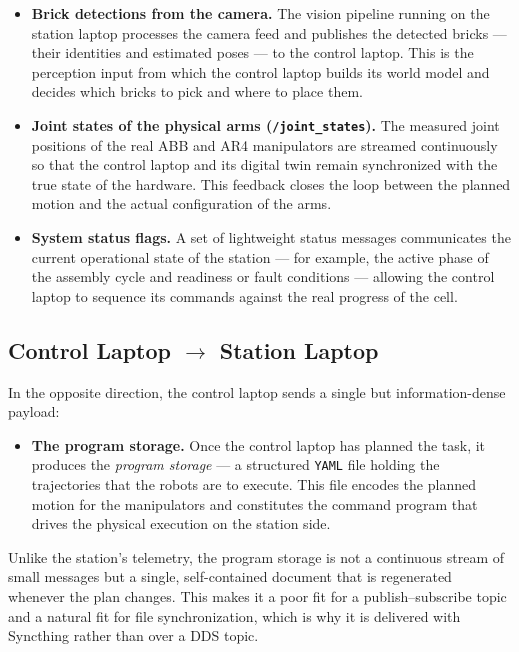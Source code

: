\begin{itemize}
    \item \textbf{Brick detections from the camera.} The vision pipeline running on the station laptop processes the camera feed and publishes the detected bricks --- their identities and estimated poses --- to the control laptop. This is the perception input from which the control laptop builds its world model and decides which bricks to pick and where to place them.
    \item \textbf{Joint states of the physical arms (\texttt{/joint\_states}).} The measured joint positions of the real ABB and AR4 manipulators are streamed continuously so that the control laptop and its digital twin remain synchronized with the true state of the hardware. This feedback closes the loop between the planned motion and the actual configuration of the arms.
    \item \textbf{System status flags.} A set of lightweight status messages communicates the current operational state of the station --- for example, the active phase of the assembly cycle and readiness or fault conditions --- allowing the control laptop to sequence its commands against the real progress of the cell.
\end{itemize}

\subsection{Control Laptop \texorpdfstring{$\rightarrow$}{->} Station Laptop}

In the opposite direction, the control laptop sends a single but information-dense payload:

\begin{itemize}
    \item \textbf{The program storage.} Once the control laptop has planned the task, it produces the \textit{program storage} --- a structured \texttt{YAML} file holding the trajectories that the robots are to execute. This file encodes the planned motion for the manipulators and constitutes the command program that drives the physical execution on the station side.
\end{itemize}

Unlike the station's telemetry, the program storage is not a continuous stream of small messages but a single, self-contained document that is regenerated whenever the plan changes. This makes it a poor fit for a publish--subscribe topic and a natural fit for file synchronization, which is why it is delivered with Syncthing rather than over a DDS topic.

